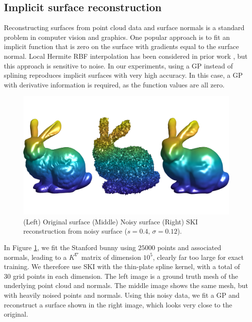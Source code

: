 \subsection{Implicit surface reconstruction}
Reconstructing surfaces from point cloud data and surface normals is a standard
problem in computer vision and graphics. One popular approach is to fit an
implicit function that is zero on the surface with gradients equal to the
surface normal. Local Hermite RBF interpolation has been considered
in prior work \cite{macedo2011hermite}, but this approach is sensitive to noise.
In our experiments, using a GP instead of splining reproduces implicit surfaces
with very high accuracy.  In this case, a GP with derivative information is
required, as the function values are all zero.

\begin{figure}[ht]
  \begin{center}
    \includegraphics[width=\textwidth]{./sgpd/pics/bunny}
    \caption{(Left) Original surface (Middle) Noisy surface (Right) SKI
    reconstruction from noisy surface ($s=0.4,\,\sigma=0.12$).}\label{fig:bunny}
  \end{center}
\end{figure}

In Figure \ref{fig:bunny}, we fit the Stanford bunny using $25000$ points and
associated normals, leading to a $K^{\nabla}$ matrix of dimension $10^5$,
clearly far too large for exact training. We therefore use SKI with the
thin-plate spline kernel, with a total of 30 grid points in each dimension. The
left image is a ground truth mesh of the underlying point cloud and normals. 
The middle image shows the same mesh, but with heavily noised points and
normals. Using this noisy data, we fit a GP and reconstruct a surface shown in
the right image, which looks very close to the original.

